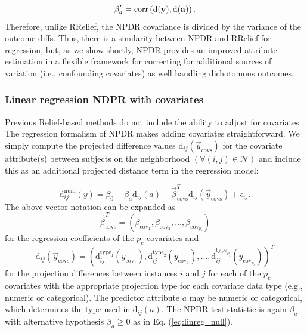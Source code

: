 \documentclass[10pt]{article}
\begin{document}
\begin{equation}
\beta'_a = \text{corr}\left( \bf{\text{d}}(\bf{y}), \bf{\text{d}}(\bf{a}) \right).
\end{equation}
Therefore, unlike RRelief, the NPDR covariance is divided by the variance of the outcome diffs. Thus, there is a similarity between NPDR and RRelief for regression, but, as we show shortly, NPDR provides an improved attribute estimation in a flexible framework for correcting for additional sources of variation (i.e., confounding covariates) as well handling dichotomous outcomes.   


\subsubsection{Linear regression NDPR with covariates}
Previous Relief-based methods do not include the ability to adjust for covariates. The regression formalism of NPDR makes adding covariates straightforward. We simply compute the projected difference values $\text{d}_{ij}(\vec{y}_{\text{covs}})$ for the covariate attribute(s) between subjects on the neighborhood $(\forall(i,j) \in \mathcal{N})$ and include this as an additional projected distance term in the regression model:

\begin{equation}\label{eq:lin_reg_cov}
    \text{d}^{\text{num}}_{ij}(y) = \beta_{0} + \beta_{a} \text{d}_{ij}(a) + \vec{\beta}^{T}_{\text{covs}}\text{d}_{ij}(\vec{y}_{\text{covs}}) + \epsilon_{ij}.
\end{equation}
The above vector notation can be expanded as  
\begin{equation}
\vec{\beta}^{T}_{\text{covs}} = \left( \beta_{\text{cov}_1}, \beta_{\text{cov}_2}, \ldots,  \beta_{\text{cov}_{p_c}} \right)
\end{equation}
for the regression coefficients of the $p_c$ covariates and 
\begin{equation}
\text{d}_{ij}(\vec{y}_\text{covs})= \left( \text{d}^{\text{type}_1}_{ij}({y}_{\text{cov}_1}), \text{d}^{\text{type}_2}_{ij}({y}_{\text{cov}_2}), \ldots, \text{d}^{\text{type}_{p_c}}_{ij}({y}_{\text{cov}_{p_c}}) \right)^{T}
\end{equation}
for the projection differences between instances $i$ and $j$ for each of the $p_c$ covariates with the appropriate projection type for each covariate data type (e.g., numeric or categorical). The predictor attribute $a$ may be numeric or categorical, which determines the type used in $\text{d}_{ij}(a)$. The NPDR test statistic is again $\beta_a$ with alternative hypothesis $\beta_a \ge 0$ as in Eq. (\ref{eq:linreg_null}). 
\end{document}
